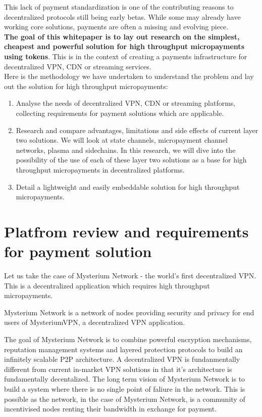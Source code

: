 \documentclass[a4paper,12pt]{article}
\begin{document}
This lack of payment standardization is one of the contributing reasons to 
decentralized protocols still being early betas. While some may already have
working core solutions, payments are often a missing and evolving piece. \\

\textbf{The goal of this whitepaper is to lay out research on the simplest, 
cheapest and powerful solution for high throughput micropayments using 
tokens}. This is in the context of creating a payments infrastructure for 
decentralized VPN, CDN or streaming services. \\

Here is the methodology we have undertaken to understand the problem and lay out
the solution for high throughput micropayments: 

\begin{enumerate}
    \item Analyse the needs of decentralized VPN, CDN or streaming platforms, 
    collecting requirements for payment solutions which are applicable.
    \item Research and compare advantages, limitations and side effects of current
    layer two solutions. We will look at state channels, micropayment channel 
    networks, plasma and sidechains. In this research, we will dive into the 
    possibility of the use of each of these layer two solutions as a base for high
    throughput micropayments in decentralized platforms.
    \item Detail a lightweight and easily embeddable solution for high throughput
    micropayments. 
\end{enumerate}

\section{Platfrom review and requirements for payment solution}

Let us take the case of Mysterium Network \cite{mysterium} - the world’s first 
decentralized VPN. This is a decentralized application which requires high throughput 
micropayments. 

Mysterium Network is a network of nodes providing security and privacy for end 
users of MysteriumVPN, a decentralized VPN application.

The goal of Mysterium Network is to combine powerful encryption mechanisms, 
reputation management systems and layered protection protocols to build an 
infinitely scalable P2P architecture. A decentralized VPN is fundanmentally 
different from current in-market VPN solutions in that it’s architecture is 
fundamentally decentalized. The long term vision of Mysterium Network is to build 
a system where there is no single point of faliure in the network. This is possible
as the network, in the case of Mysterium Network, is a community of incentivised 
nodes renting their bandwidth in exchange for payment.
\end{document}

